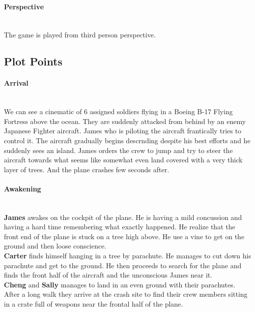             \paragraph{\Large Perspective}\mbox{}\\
                The game is played from third person perspective.
    \subsection{\Large Plot Points}
        \paragraph{\Large Arrival}\mbox{}\\
            We can see a cinematic of 6 assigned soldiers flying in a Boeing 
            B-17 Flying Fortress above the ocean. They are suddenly attacked 
            from behind by an enemy Japanese Fighter aircraft. James who is piloting 
            the aircraft frantically tries to control it. The aircraft gradually begins descrnding
            despite his best efforts and he suddenly sees an island. James orders the crew
            to jump and try to steer the aircraft towards what seems like somewhat 
            even land covered with a very thick layer of trees. And the plane crashes 
            few seconds after.
        \paragraph{\Large Awakening}\mbox{}\\
            \textbf{James} awakes on the cockpit of the plane. He is having a mild 
            concussion and having a hard time remembering what exactly happened. He 
            realize that the front end of the plane is stuck on a tree high above. He 
            use a vine to get on the ground and then loose conscience. \\
            \textbf{Carter} finds himself hanging in a tree by parachute. He manages
            to cut down his parachute and get to the ground. He then proceeds to search
            for the plane and finds the front half of the aircraft and the unconscious 
            James near it. \\
            \textbf{Cheng} and \textbf{Sally} manages to land in an even ground with their
            parachutes. After a long walk they arrive at the crash site to find their crew
            members sitting in a crate full of weapons near the frontal half of the plane. 
